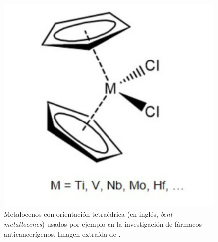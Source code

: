 \begin{itemize}
        \begin{figure}[h!]
            \centering
            \includegraphics[scale=0.6]{imagenes/bent_metallocene.png}
            \caption{Metalocenos con orientación tetraédrica (en inglés, \textit{bent metallocenes}) usados por ejemplo en la investigación de fármacos anticancerígenos. Imagen extraída de \cite{bent_metallocenes}.}
            \label{fig:enter-label}
        \end{figure}
    
\end{itemize}
